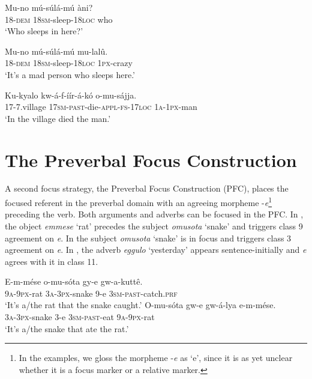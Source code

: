 \documentclass[output=paper]{langsci/langscibook}
\begin{document}
\ea\label{ex:vanderwal:8}
\ea\label{ex:vanderwal:8a}
\gll  Mu-no    mú-súlá-mú    àni?\\
       18-\textsc{dem}  \textsc{18sm}-sleep-\textsc{18loc}  who\\
\glt   ‘Who sleeps in here?’

\ex\label{ex:vanderwal:8b}
\gll  Mu-no    mú-súlá-mú    mu-lalû.\\
       18-\textsc{dem}  1\textsc{8sm}-sleep-\textsc{18loc}  \textsc{1px}-crazy\\
\glt   ‘It’s a mad person who sleeps here.’
\z
\z

\ea\label{ex:vanderwal:9}
\gll Ku-kyalo  kw-á-f-íír-á-kó      o-mu-sájja.\\
     17-7.village  \textsc{17sm}-\textsc{past}-die-\textsc{appl}-\textsc{fs}-\textsc{17loc}  \textsc{1a-1px}-man\\
\glt ‘In the village died the man.’
\z

\section{The Preverbal Focus Construction}\label{sec:vanderwal:3}
 

A second focus strategy, the Preverbal Focus Construction (PFC), places the focused referent in the preverbal domain with an agreeing morpheme -\textit{e}\footnote{In the examples, we gloss the morpheme -\textit{e} as ‘e’, since it is as yet unclear whether it is a focus marker or a relative marker.}{} preceding the verb. Both arguments and adverbs can be focused in the PFC. In , the object \textit{emmese} ‘rat’ precedes the subject \textit{omusota} ‘snake’ and triggers class 9 agreement on \textit{e}. In  the subject \textit{omusota} ‘snake’ is in focus and triggers class 3 agreement on \textit{e}. In , the adverb \textit{eggulo} ‘yesterday’ appears sentence-initially and \textit{e} agrees with it in class 11.

\ea\label{ex:vanderwal:10}
\ea\label{ex:vanderwal:10a}
\gll    E-m-mése  o-mu-sóta    gy-e  gw-a-kuttê.\\
       \textsc{9a-9px}-rat  \textsc{3a}-\textsc{3px}-snake  9-e  \textsc{3sm}-\textsc{past}-catch.\textsc{prf}\\
\glt   ‘It’s a/the rat that the snake caught.’
\ex\label{ex:vanderwal:10b}
\gll    O-mu-sóta    gw-e  gw-á-lya    e-m-mése.\\
       \textsc{3a-3px}-snake  3-e  \textsc{3sm-past}-eat  \textsc{9a-9px}-rat\\
\glt   ‘It’s a/the snake that ate the rat.’
\z
\z
\end{document}
